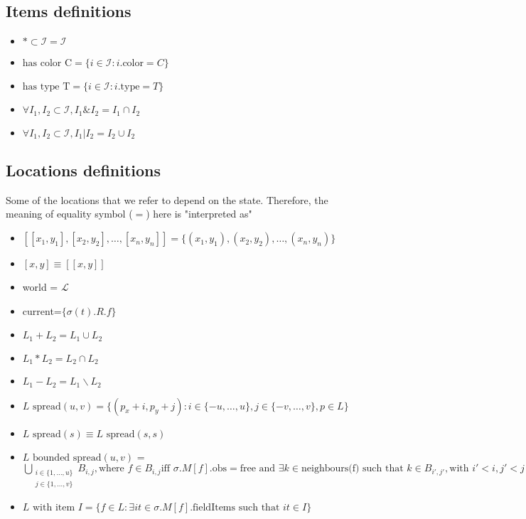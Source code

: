 \documentclass{article}
\begin{document}
\subsection*{Items definitions}
\begin{itemize}
\item $* \subset \mathcal{I} = \mathcal{I}$
\item $ \text{has color C} = \{ i \in \mathcal{I}: i.\text{color}=C \}$
\item $ \text{has type T} = \{ i \in \mathcal{I}: i.\text{type}=T \}$
\item $\forall I_1, I_2 \subset \mathcal{I},  I_1 \& I_2 = I_1 \cap I_2$
\item $\forall I_1, I_2 \subset \mathcal{I}, I_1 | I_2 = I_2 \cup I_2$
\end{itemize}

\subsection*{Locations definitions}
Some of the locations that we refer to depend on the state. Therefore, the meaning of equality symbol ($=$) here is "interpreted as"\\
\begin{itemize}
\item $[[ x_1, y_1 ],[ x_2, y_2 ], \ldots, [ x_n, y_n]] = \{(x_1, y_1), (x_2, y_2), \ldots, (x_n, y_n) \}$
\item $[x,y] \equiv [[x,y]]$
\item world = $\mathcal{L}$
\item current=$\{ \sigma(t).R.f\}$
\item $L_1 + L_2 = L_1 \cup L_2$
\item $L_1 * L_2 = L_2 \cap L_2$
\item $L_1 - L_2 = L_1 \backslash L_2$
\item $L \text{ spread}(u, v) = \{ (p_x+i, p_y+j): i \in \{-u, \ldots, u \}, j \in \{-v, \ldots, v \}, p \in L \}$
\item $L \text{ spread}(s) \equiv L \text{ spread}(s,s)$
\item $L \text{ bounded spread}(u,v)$ = $\bigcup\limits_{\substack{i \in \{1,\ldots, u\} \\j \in \{1, \ldots, v \}}}B_{i,j}, \text{where } f \in B_{i,j} \text{iff } \sigma.M[f].\text{obs} = \text{free } \text{and }  \exists k \in \text{neighbours(f) such that } k \in B_{i', j'},  \text{with } i' < i, j'<j$
\item $L \text{ with item } I = \{f \in L: \exists {it} \in \sigma.M[f].\text{fieldItems} \text{ such that } it \in I\}$
\end{itemize}
\end{document}
